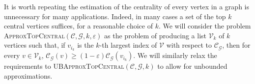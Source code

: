 \documentclass{report}
\newcommand{\algoname}[1]{\textnormal{\textsc{#1}}}
\begin{document}
It is worth repeating the estimation of the centrality of every vertex in a graph is unnecessary for many applications.
Indeed, in many cases a set of the top $k$ central vertices suffices, for a reasonable choice of $k$. 
We will consider the problem \algoname{ApproxTopCentral}$(\mathcal{C}, \mathcal{G}, k, \varepsilon)$ as the problem of producing a list $\mathcal{V}_k$ of $k$ vertices such that, if $v_{i_k}$ is the $k$-th largest index of $\mathcal{V}$ with respect to $\mathcal{C}_\mathcal{G}$, then for every $v \in \mathcal{V}_k$, $\mathcal{C}_\mathcal{G}(v) \geq (1-\varepsilon)\mathcal{C}_\mathcal{G}(v_{i_k})$. 
We will similarly relax the requirements to \algoname{UBApproxTopCentral}$(\mathcal{C}, \mathcal{G}, k)$ to allow for unbounded approximations. 
\end{document}
